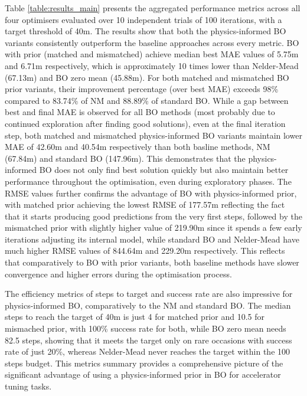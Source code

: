 Table \ref{table:results_main} presents the aggregated performance metrics across all four optimisers evaluated over 10 independent trials 
of 100 iterations, with a target threshold of \SI{40}{\mu}m. The results show that both the physics-informed BO variants consistently outperform the baseline 
approaches across every metric. BO with prior (matched and mismatched) achieve median best MAE values of \SI{5.75}{\mu}m and \SI{6.71}{\mu}m respectively, which is approximately 10 times lower 
than Nelder-Mead (\SI{67.13}{\mu}m) and BO zero mean (\SI{45.88}{\mu}m). For both matched and mismatched BO prior variants, their improvement percentage (over best MAE) exceeds 98\% compared to 83.74\% of NM and 88.89\% of standard BO.
While a gap between best and final MAE is observed for all BO methods (most probably due to continued exploration after finding good solutions), even at the final iteration step, both matched and mismatched physics-informed BO variants maintain lower MAE 
of \SI{42.60}{\mu}m and \SI{40.54}{\mu}m respectively than both basline methods, NM (\SI{67.84}{\mu}m) and standard BO (\SI{147.96}{\mu}m). This demonstrates that the physics-informed BO does not only find best solution quickly but also 
maintain better performance throughout the optimisation, even during exploratory phases. 
The RMSE values further confirms the advantage of BO with physics-informed prior, with matched prior achieving
the lowest RMSE of \SI{177.57}{\mu}m reflecting the fact that it starts producing good predictions from the very first steps, followed by the mismatched prior with slightly higher value of \SI{219.90}{\mu}m 
since it spends a few early iterations adjusting its internal model, while standard BO and Nelder-Mead have much higher RMSE values of \SI{844.64}{\mu}m and \SI{229.20}{\mu}m respectively. 
This reflects that comparatively to BO with prior variants, both baseline methods have slower convergence and higher errors during the optimisation process. \

The efficiency metrics of steps to target and success rate are also impressive for physics-informed BO, comparatively to the NM and standard BO. The median steps to reach the target of \SI{40}{\mu}m is just 4 for matched prior and 10.5 for mismached prior, with 100\% success rate for both,
while BO zero mean needs 82.5 steps, showing that it meets the target only on rare occasions with success rate of just 20\%, whereas Nelder-Mead never reaches the target within the 100 steps budget. This metrics summary provides a comprehensive picture of the significant advantage of using a physics-informed prior
in BO for accelerator tuning tasks. 


